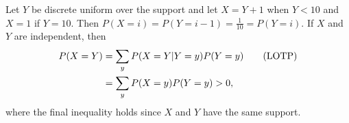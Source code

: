 
\setcounter{theorem}{38}
\begin{exercise}[BH.3.39]
\begin{solution}
    Let $Y$ be discrete uniform over the support and let $X=Y+1$ when $Y<10$ and $X=1$ if $Y=10$. Then $P(X=i) = P(Y=i-1) = \frac{1}{10} = P(Y=i)$. If $X$ and $Y$ are independent, then
    \begin{align*}
        P(X=Y) &= \sum_{y}P(X=Y|Y=y)P(Y=y) \tag*{(\text{LOTP})}\\
        &= \sum_{y}P(X=y)P(Y=y)>0,
    \end{align*}
    where the final inequality holds since $X$ and $Y$ have the same support.
\end{solution}
\end{exercise}


